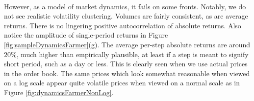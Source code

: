 \documentclass[runningheads]{llncs}
\begin{document}
\paragraph*{}
However, as a model of market dynamics, it fails on some fronts. Notably, we do not see realistic volatility clustering. Volumes are fairly consistent, as are average returns. There is no lingering positive autocorrelation of absolute returns. Also notice the amplitude of single-period returns in Figure \ref{fig:sampleDynamicsFarmer}(g). The average per-step absolute returns are around $20\%$, much higher than empirically plausible, at least if a step is meant to signify short period, such as a day or less. This is clearly seen when we use actual prices in the order book. The same prices which look somewhat reasonable when viewed on a log scale appear quite volatile prices when viewed on a normal scale as in Figure \ref{fig:dynamicsFarmerNonLog}.
\end{document}
